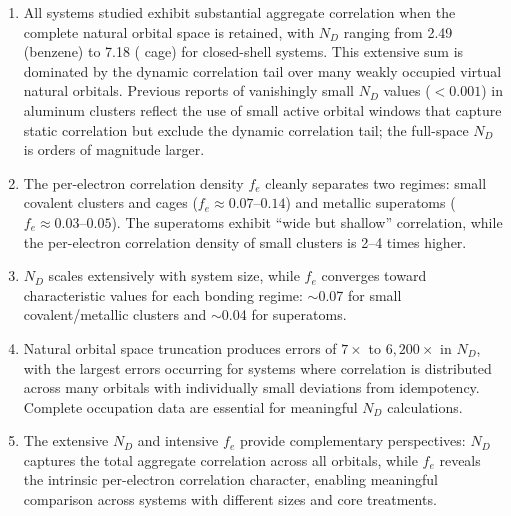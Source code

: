 \documentclass[12pt,a4paper]{article}
\begin{document}
\begin{enumerate}
  \item All systems studied exhibit substantial aggregate correlation
    when the complete natural orbital space is retained, with
    $N_D$ ranging from 2.49 (benzene) to 7.18 ( cage) for closed-shell
    systems. This extensive sum is dominated by the dynamic correlation
    tail over many weakly occupied virtual natural orbitals.
    Previous reports of vanishingly small $N_D$ values
    ($< 0.001$) in aluminum clusters reflect the use of small active
    orbital windows that capture static correlation but exclude the
    dynamic correlation tail; the full-space $N_D$ is orders of
    magnitude larger.

  \item The per-electron correlation density $f_e$ cleanly separates two
    regimes: small covalent clusters and cages ($f_e \approx 0.07$--$0.14$) and
    metallic superatoms ($f_e \approx 0.03$--$0.05$).
    The superatoms exhibit ``wide but shallow''
    correlation, while the per-electron correlation density of
    small clusters is 2--4 times higher.

  \item $N_D$ scales extensively with system size,
    while $f_e$ converges toward characteristic values for each bonding
    regime: $\sim$0.07 for small covalent/metallic clusters and $\sim$0.04
    for  superatoms.

  \item Natural orbital space truncation produces errors of
    $7\times$ to $6{,}200\times$ in $N_D$, with the
    largest errors occurring for systems where correlation is distributed
    across many orbitals with individually small deviations from idempotency.
    Complete occupation data are essential for meaningful $N_D$ calculations.

  \item The extensive $N_D$ and intensive $f_e$ provide complementary
    perspectives: $N_D$ captures the total aggregate correlation across all
    orbitals, while $f_e$ reveals the intrinsic per-electron correlation
    character, enabling meaningful comparison across systems with different
    sizes and core treatments.


\end{enumerate}
\end{document}
